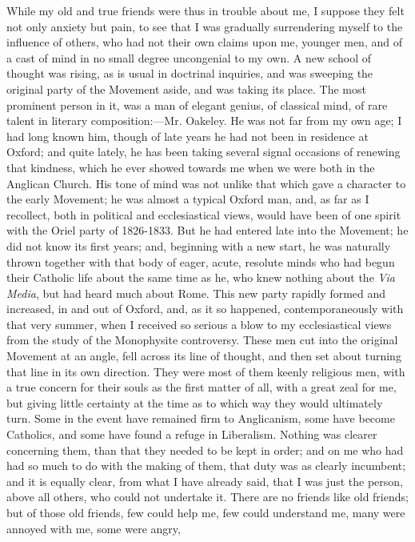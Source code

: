 While my old and true friends were thus in trouble about me, I
suppose they felt not only anxiety but pain, to see that I was gradually
surrendering myself to the influence of others, who had not their own
claims upon me, younger men, and of a cast of mind in no small
degree uncongenial to my own. A new school of thought was rising, as
is usual in doctrinal inquiries, and was sweeping the original
party of the Movement aside, and was taking its place. The most
prominent person in it, was a man of elegant genius, of classical mind,
of rare talent in literary composition:—Mr. Oakeley. He was
not far from my own age; I had long known him, though of late years he
had not been in residence at Oxford; and quite lately, he has been
taking several signal occasions of renewing that kindness, which he ever
showed towards me when we were both in the Anglican Church. His tone of
mind was not unlike that which gave a character to the early Movement;
he was almost a typical Oxford man, and, as far as I recollect, both in
political and ecclesiastical views, would have been of one spirit with
the Oriel party of 1826-1833. But he had entered late into the Movement;
he did not know its first years; and, beginning with a new start, he was
naturally thrown together with that body of eager, acute, resolute minds
who had begun their Catholic life about the same time as he, who knew
nothing about the \emph{Via Media}, but had heard much about Rome. This
new party rapidly formed and increased, in and out of Oxford, and,
as it so happened, contemporaneously with that very summer, when I
received so serious a blow to my ecclesiastical views from the study of
the Monophysite controversy. These men cut into the original Movement at
an angle, fell across its line of thought, and then set about turning
that line in its own direction. They were most of them keenly religious
men, with a true concern for their souls as the first matter of all,
with a great zeal for me, but giving little certainty at the time as to
which way they would ultimately turn. Some in the event have remained
firm to Anglicanism, some have become Catholics, and some have found a
refuge in Liberalism. Nothing was clearer concerning them, than that
they needed to be kept in order; and on me who had had so much to do
with the making of them, that duty was as clearly incumbent; and it is
equally clear, from what I have already said, that I was just the
person, above all others, who could not undertake it. There are no
friends like old friends; but of those old friends, few could help me,
few could understand me, many were annoyed with me, some were angry,

